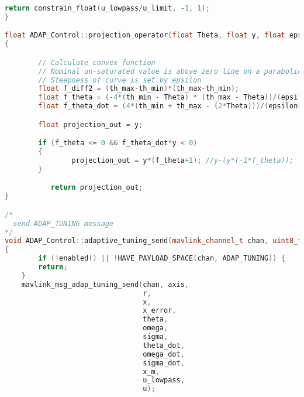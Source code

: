 \begin{lstlisting}[language=c++]
    return constrain_float(u_lowpass/u_limit, -1, 1);
}

float ADAP_Control::projection_operator(float Theta, float y, float epsilon, float th_max, float th_min) const
{

        // Calculate convex function
        // Nominal un-saturated value is above zero line on a parabolic curve
        // Steepness of curve is set by epsilon
        float f_diff2 = (th_max-th_min)*(th_max-th_min);
        float f_theta = (-4*(th_min - Theta) * (th_max - Theta))/(epsilon*f_diff2);
        float f_theta_dot = (4*(th_min + th_max - (2*Theta)))/(epsilon*f_diff2);

        float projection_out = y;

        if (f_theta <= 0 && f_theta_dot*y < 0)
        {
                projection_out = y*(f_theta+1); //y-(y*(-1*f_theta));
        }

           return projection_out;
}

/*
  send ADAP_TUNING message
*/
void ADAP_Control::adaptive_tuning_send(mavlink_channel_t chan, uint8_t axis)
{
        if (!enabled() || !HAVE_PAYLOAD_SPACE(chan, ADAP_TUNING)) {
        return;
    }
    mavlink_msg_adap_tuning_send(chan, axis,
                                 r,
                                 x,
                                 x_error,
                                 theta,
                                 omega,
                                 sigma,
                                 theta_dot,
                                 omega_dot,
                                 sigma_dot,
                                 x_m,
                                 u_lowpass,
                                 u);
\end{lstlisting}